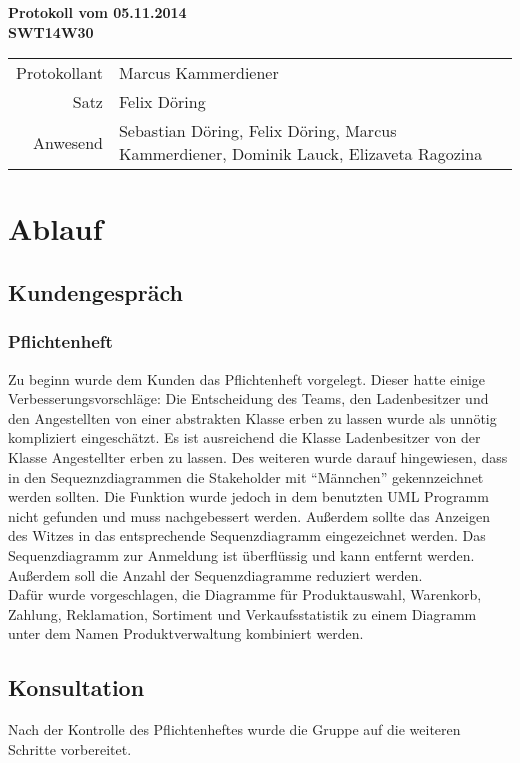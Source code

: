 \documentclass{scrartcl}
\begin{document}
\begin{center}
\LARGE \bf{Protokoll vom 05.11.2014 \\
SWT14W30}
\end{center}

\begin{tabular}{rp{10cm}}
Protokollant & Marcus Kammerdiener \\
Satz & Felix Döring \\
Anwesend & Sebastian Döring, Felix Döring, Marcus Kammerdiener, Dominik Lauck, Elizaveta Ragozina \\
\end{tabular}

\vspace*{3em}

\section{Ablauf}
\subsection{Kundengespr\"ach}
\subsubsection{Pflichtenheft}
Zu beginn wurde dem Kunden das Pflichtenheft vorgelegt. Dieser hatte einige Verbesserungsvorschläge: Die Entscheidung des Teams, den Ladenbesitzer und den Angestellten von einer abstrakten Klasse erben zu lassen wurde als unn\"otig kompliziert eingeschätzt. Es ist ausreichend die Klasse Ladenbesitzer von der Klasse Angestellter erben zu lassen. Des weiteren wurde darauf hingewiesen, dass in den Sequeznzdiagrammen die Stakeholder mit "`M\"annchen"' gekennzeichnet werden sollten. Die Funktion wurde jedoch in dem benutzten UML Programm nicht gefunden und muss nachgebessert werden. Außerdem sollte das Anzeigen des Witzes in das entsprechende Sequenzdiagramm eingezeichnet werden. Das Sequenzdiagramm zur Anmeldung ist \"uberflüssig und kann entfernt werden. Außerdem soll die Anzahl der Sequenzdiagramme reduziert werden.\\
Daf\"ur wurde vorgeschlagen, die Diagramme für Produktauswahl, Warenkorb, Zahlung, Reklamation, Sortiment und Verkaufsstatistik zu einem Diagramm unter dem Namen Produktverwaltung kombiniert werden.
\subsection{Konsultation}
Nach der Kontrolle des Pflichtenheftes wurde die Gruppe auf die weiteren Schritte vorbereitet.
\end{document}
